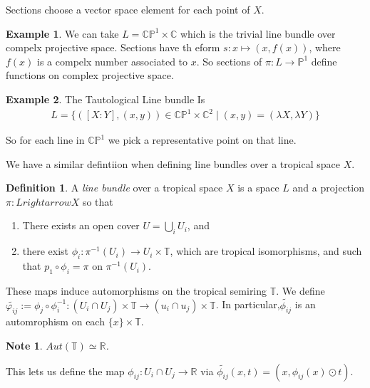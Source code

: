 \documentclass[12pt]{memoir}
\newtheorem{note}{Note}
\theoremstyle{definition}
\newtheorem{protoexample}{Example}[section]
\newenvironment{ex}
   {\begin{protoexample}}
   {\end{protoexample}}
\newtheorem{protodefinition}{Definition}[section]
\newenvironment{define}
   {\begin{protodefinition}}
   {\end{protodefinition}}
\def\RR{{\mathbb R}}
\def\CC{{\mathbb C}}
\def\TT{{\mathbb T}}
\def\PP{{\mathbb P}}
\begin{document}
Sections choose a vector space element for each point of $X$.

\begin{ex}
    We can take $L= \CC\PP^1 \times \CC$ which is the trivial line bundle over compelx projective space. Sections have th eform $s:x \mapsto (x,f(x))$, where $f(x)$ is a compelx number associated to $x$. So sections of $\pi:L \rightarrow \PP^1$ define functions on complex projective space.
\end{ex}


\begin{ex}
    The Tautological Line bundle Is
    \begin{align*}
        L=\{([X:Y],(x,y)) \in \CC\PP^1 \times \CC^2 \; |\; (x,y) = (\lambda X, \lambda Y)\}
    \end{align*}

    So for each line in $\CC\PP^1$ we pick a representative point on that line.
\end{ex}





We have a similar defintiion when defining line bundles over a tropical space $X$.


\begin{define}
    A \emph{line bundle} over a tropical space $X$ is a space $L$ and a projection $\pi:L rightarrow X$ so that
    \begin{enumerate}
        \item There exists an open cover $U = \bigcup \limits_{i} U_i$, and
        \item there exist $\phi_i:\pi^{-1}(U_i) \rightarrow U_i \times \TT$, which are tropical isomorphisms, and such that $p_1 \circ \phi_i = \pi$ on $\pi^{-1}(U_i)$.
    \end{enumerate}
\end{define}


  These maps induce automorphisms on the tropical semiring $\TT$. We define $\tilde{\varphi_{ij}} := \phi_j \circ \phi_i^{-1}: (U_i \cap U_j) \times \TT \rightarrow (u_i \cap u_j)\times \TT$. In particular,$ \tilde{\phi_{ij}}$ is an automrophism on each $\{x\} \times \TT$.

  \begin{note}
    $Aut(\TT) \simeq \RR$.
  \end{note}



  This lets us define the map $\phi_{ij} : U _i \cap U_j \rightarrow \RR$ via
  $\tilde{\phi_{ij}}(x,t) = (x,\phi_{ij}(x) \odot t)$.
\end{document}
